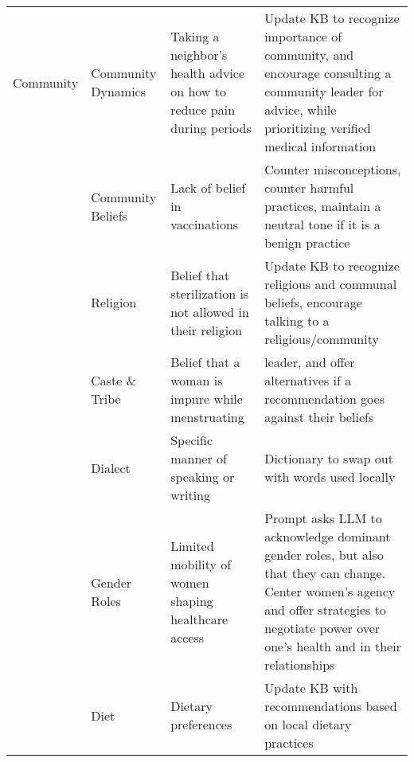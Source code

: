 \begin{table*}[h]
\begin{tabular}{>{\raggedright\arraybackslash}p{1.2cm} p{2.6cm} p{4.3cm} p{6cm}}
Community & Community Dynamics & Taking a neighbor's health advice on how to reduce pain during periods & Update KB to recognize importance of community,  and encourage consulting a community leader for advice, while prioritizing verified medical information \\
   & Community Beliefs & Lack of belief in vaccinations & Counter misconceptions, counter harmful practices, maintain a neutral tone if it is a benign practice  \\  
 & Religion & Belief that sterilization is not allowed in their religion & Update KB to recognize religious and communal beliefs, encourage talking to a religious/community \\
 & Caste \& Tribe & Belief that a woman is impure while menstruating &  leader, and offer alternatives if a recommendation goes against their beliefs \\
 & Dialect & Specific manner of speaking or writing & Dictionary to swap out with words used locally \\
& Gender Roles & Limited mobility of women shaping healthcare access & Prompt asks LLM to acknowledge dominant gender roles, but also that they can change. Center  women's agency and offer strategies to negotiate power over one's health and in their relationships\\
 & Diet & Dietary preferences & Update KB with recommendations based on local dietary practices \\
   \hline
   

\end{tabular}
\end{table*}
